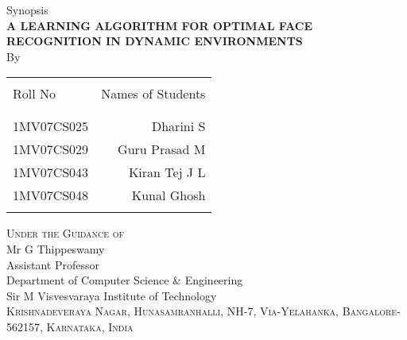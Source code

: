 
\begin{titlepage}
\begin{center}

\textup{\Large Synopsis}\\[0.5cm]

\uppercase{\Large \textbf {A Learning Algorithm for Optimal Face Recognition in Dynamic Environments}}\\[3.0cm]

\vspace{1.0cm}
\normalsize By \\
\begin{table}[h]
\centering
\begin{tabular}{lr}\hline \\
Roll No & Names of Students \\ \\ \hline
\\
1MV07CS025 & Dharini S \\
1MV07CS029 & Guru Prasad M \\
1MV07CS043 & Kiran Tej J L \\
1MV07CS048 & Kunal Ghosh \\ \\ \hline 
\end{tabular}
\end{table}

\vfill

\normalsize
\textsc{Under the Guidance of }\\
Mr G Thippeswamy\\
{\small Assistant Professor}\\
{\small Department of Computer Science & Engineering}\\
\LARGE{Sir M Visvesvaraya Institute of Technology }\\
\normalsize
\textsc{Krishnadeveraya Nagar, Hunasamranhalli, NH-7,
Via-Yelahanka, Bangalore-562157, Karnataka, India}\\

\vspace{0.5cm}


\end{center}

\end{titlepage}
